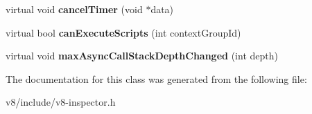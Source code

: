 \begin{DoxyCompactItemize}
virtual void {\bfseries cancel\+Timer} (void $\ast$data)
\item 
\mbox{\label{classv8__inspector_1_1V8InspectorClient_a889174cfb82aee1148e61b9fe3801605}} 
virtual bool {\bfseries can\+Execute\+Scripts} (int context\+Group\+Id)
\item 
\mbox{\label{classv8__inspector_1_1V8InspectorClient_afdb594d52d1a1dfc751f11dbcf2166bf}} 
virtual void {\bfseries max\+Async\+Call\+Stack\+Depth\+Changed} (int depth)
\end{DoxyCompactItemize}


The documentation for this class was generated from the following file\+:\begin{DoxyCompactItemize}
\item 
v8/include/v8-\/inspector.\+h\end{DoxyCompactItemize}
